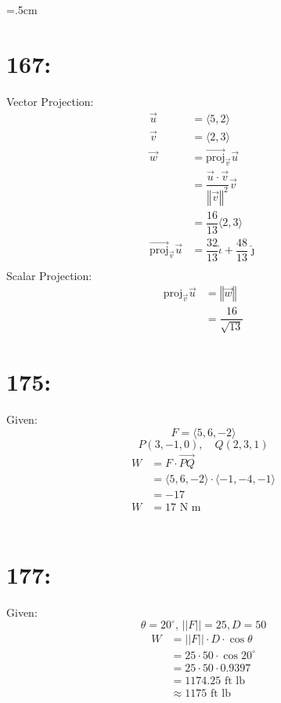 \documentclass[a4paper,12pt,openany]{article}
\newcommand{\dotp}[2]{
    \vec{#1} \cdot \vec{#2}
}
\newcommand{\uniti}{
    \hat{\iota}
}
\newcommand{\unitj}{
    \hat{\jmath}
}
\newcommand{\magn}[1]{
    \left\Vert#1\right\Vert
}
\begin{document}
\parskip=.5cm
\parindent=0cm


\begin{multicols*}{2}
    \section*{167:}
Vector Projection:
\begin{align*}
    \vec{u} &= \langle5, 2\rangle \\
    \vec{v} &= \langle2, 3\rangle \\
    \vec{w} &= \vec{\text{proj}}_{\vec{v}} \vec{u} \\
    &= \dfrac{\dotp{u}{v}}{\magn{\vec{v}}^2} \vec{v} \\
    &= \dfrac{16}{13} \langle2, 3\rangle \\
    \vec{\text{proj}}_{\vec{v}} \vec{u} &= \dfrac{32}{13} \uniti + \dfrac{48}{13} \unitj \\
\end{align*}
    Scalar Projection: 
\begin{align*}
    \text{proj}_{\vec{v}} \vec{u} &= \magn{\vec{w}} \\
    &= \dfrac{16}{\sqrt{13}}
\end{align*}

\section*{175:}
Given: 
\[
    F = \langle 5, 6, -2 \rangle
\]
\[
    P(3, -1, 0),\quad Q(2, 3, 1)
\] 
\begin{align*}
    W &= F \cdot \vec{PQ} \\
    &= \langle 5, 6, -2 \rangle \cdot \langle -1, -4, -1 \rangle \\
    &= -17  \\
    W &= 17 \text{ N m}
\end{align*}
\vspace{2in}\\
\columnbreak
\section*{177:}
Given:
\[
    \theta = 20^\circ, \, ||F|| = 25, D = 50
\]
\begin{align*}
    W &= ||F|| \cdot D \cdot \cos \theta \\
    &= 25 \cdot 50 \cdot \cos 20^\circ \\
    &= 25 \cdot 50 \cdot 0.9397 \\
    &= 1174.25 \text{ ft lb} \\
    &\approx 1175 \text{ ft lb}
\end{align*}


\end{multicols*}
\end{document}
